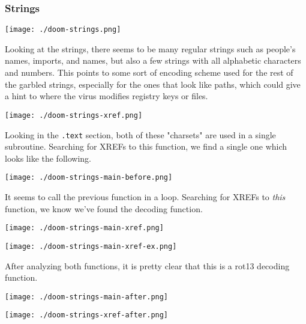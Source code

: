 \documentclass[11pt]{article}
\begin{document}
\subsubsection{Strings}
\label{sec:orgae1ca10}
\begin{center}
\texttt{[image: ./doom-strings.png]}
\end{center}

Looking at the strings, there seems to be many regular strings such as
people's names, imports, and names, but also a few strings with all
alphabetic characters and numbers. This points to some sort of
encoding scheme used for the rest of the garbled strings, especially
for the ones that look like paths, which could give a hint to where
the virus modifies registry keys or files.

\begin{center}
\texttt{[image: ./doom-strings-xref.png]}
\end{center}

Looking in the \texttt{.text} section, both of these "charsets" are used in a
single subroutine. Searching for XREFs to this function, we find a
single one which looks like the following.

\begin{center}
\texttt{[image: ./doom-strings-main-before.png]}
\end{center}

It seems to call the previous function in a loop. Searching for
XREFs to \emph{this} function, we know we've found the decoding
function.

\begin{center}
\texttt{[image: ./doom-strings-main-xref.png]}
\end{center}

\begin{center}
\texttt{[image: ./doom-strings-main-xref-ex.png]}
\end{center}

After analyzing both functions, it is pretty clear that this is a
rot13 decoding function.

\begin{center}
\texttt{[image: ./doom-strings-main-after.png]}
\end{center}

\begin{center}
\texttt{[image: ./doom-strings-xref-after.png]}
\end{center}
\end{document}

